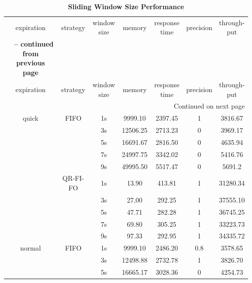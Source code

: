 \begin{center}
	\begin{longtable}{|c||c||c|c|c|c|c|}
	\caption{\textbf{Sliding Window Size Performance}} \label{tab:6-swsp} \\
	\hline expiration & strategy & \makecell{window \\ size} & memory & \makecell{response \\ time} & precision & \makecell{through-\\put} \\ \hhline{|=#=#=|=|=|=|=|}
	\endfirsthead
	\multicolumn{7}{c} {{\bfseries \tablename\ \thetable{} -- continued from previous page}} \\
	\hline expiration & strategy & \makecell{window \\ size} & memory & \makecell{response \\ time} & precision & \makecell{through-\\put} \\ \hline 
	\endhead
	\hline \multicolumn{7}{|r|}{{Continued on next page}} \\ \hline
	\endfoot
	\hline
	\endlastfoot    
        quick & FIFO & 1s & 9999.10 & 2397.45 & 1 & 3816.67 \\ \cline{3-7}
			  &	     & 3s & 12506.25 & 2713.23 & 0 & 3969.17 \\ \cline{3-7}
			  &      & 5s & 16691.67 & 2816.50 & 0 & 4635.94 \\ \cline{3-7}
			  &      & 7s & 24997.75 & 3342.02 & 0 & 5416.76 \\ \cline{3-7}
			  &      & 9s & 49995.50 & 5517.47 & 0 & 5691.2 \\ \cline{2-7}
			  & QR-FI-FO & 1s & 13.90 & 413.81 & 1 & 31280.34 \\ \cline{3-7}
			  &		     & 3s & 27.00 & 292.25 & 1 & 37555.10 \\ \cline{3-7}
			  &          & 5s & 47.71 & 282.28 & 1 & 36745.25 \\ \cline{3-7}
			  &          & 7s & 69.80 & 305.25 & 1 & 33223.73 \\ \cline{3-7}
			  &          & 9s & 97.33 & 292.95 & 1 & 34335.72 \\ \hhline{|=#=#=|=|=|=|=|}
        normal & FIFO & 1s & 9999.10 & 2486.20 & 0.8 & 3578.65 \\ \cline{3-7}
			   &	  & 3s & 12498.88 & 2732.78 & 1 & 3826.70 \\ \cline{3-7}
			   &      & 5s & 16665.17 & 3028.36 & 0 & 4254.73 \\ \cline{3-7}

\end{longtable}
\end{center}
